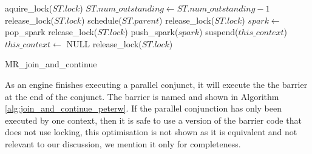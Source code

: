 \begin{algorithm}
\begin{algorithmic}
  \State aquire\_lock($ST.lock$)
  \State $ST.num\_outstanding \gets ST.num\_outstanding - 1$
      \State release\_lock($ST.lock$)
    \Else
      \State schedule($ST.parent$)
      \State release\_lock($ST.lock$)
    \EndIf
  \Else
    \State $spark \gets$ pop\_spark
        \State release\_lock($ST.lock$)
      \EndIf
      \State push\_spark($spark$)
    \EndIf
       \State suspend($this\_context$)
       \State $this\_context \gets$ NULL
    \EndIf
    \State release\_lock($ST.lock$)
  \EndIf
\EndProcedure
\end{algorithmic}
\caption{MR\_join\_and\_continue}
\label{alg:join_and_continue_peterw}
\end{algorithm}

As an engine finishes executing a parallel conjunct,
it will execute the the barrier at the end of the conjunct.
The barrier is named \joinandcontinue and shown in
Algorithm \ref{alg:join_and_continue_peterw}.
If the parallel conjunction has only been executed by
one context,
then it is safe to use a version of the barrier code that does not use
locking,
this optimisation is not shown as it is equivalent and not relevant to
our discussion,
we mention it only for completeness.

